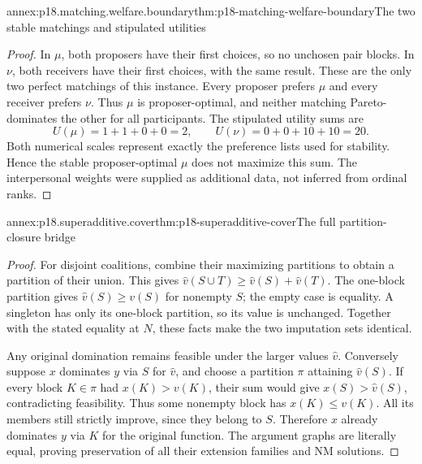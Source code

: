 \begin{annexitem}{annex:p18.matching.welfare.boundary}{thm:p18-matching-welfare-boundary}{The two stable matchings and stipulated utilities}
\begin{proof}
In \(\mu\), both proposers have
their first choices, so no
unchosen pair blocks. In
\(\nu\), both receivers have
their first choices, with
the same result. These
are the only two perfect
matchings of this instance.
Every proposer prefers
\(\mu\) and every receiver
prefers \(\nu\). Thus
\(\mu\) is proposer-optimal,
and neither matching
Pareto-dominates the other
for all participants.
The stipulated utility
sums are
\[
                       U(\mu)=1+1+0+0=2,\qquad
                       U(\nu)=0+0+10+10=20.
\]
Both numerical scales
represent exactly the
preference lists used
for stability. Hence
the stable proposer-optimal
\(\mu\) does not maximize
this sum. The interpersonal
weights were supplied
as additional data,
not inferred from
ordinal ranks.
\end{proof}
\end{annexitem}

\begin{annexitem}{annex:p18.superadditive.cover}{thm:p18-superadditive-cover}{The full partition-closure bridge}
\begin{proof}
For disjoint coalitions, combine their maximizing
partitions to obtain a partition of their union.
This gives
\(\widehat v(S\cup T)\geq\widehat v(S)+\widehat v(T)\).
The one-block partition gives
\(\widehat v(S)\geq v(S)\) for nonempty \(S\);
the empty case is equality. A singleton
has only its one-block partition, so
its value is unchanged. Together with
the stated equality at \(N\), these
facts make the two imputation sets
identical.

Any original domination remains feasible
under the larger values \(\widehat v\).
Conversely suppose \(x\) dominates \(y\)
via \(S\) for \(\widehat v\), and
choose a partition \(\pi\) attaining
\(\widehat v(S)\). If every block
\(K\in\pi\) had \(x(K)>v(K)\),
their sum would give
\(x(S)>\widehat v(S)\), contradicting
feasibility. Thus some nonempty
block has \(x(K)\leq v(K)\).
All its members still strictly
improve, since they belong to
\(S\). Therefore \(x\) already
dominates \(y\) via \(K\) for
the original function. The
argument graphs are literally
equal, proving preservation
of all their extension
families and NM solutions.
\end{proof}
\end{annexitem}

